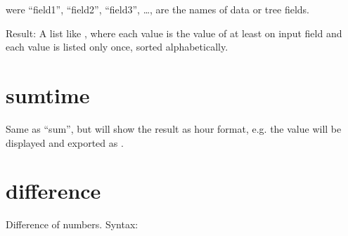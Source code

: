 \documentclass[letterpaper,10pt,english]{sphinxmanual}
\begin{document}
\begin{sphinxVerbatim}[commandchars=\\\{\}]
 
     
     \PYG{p}{[}  \PYG{p}{]}
     \PYG{p}{[} \PYG{p}{]}
     \PYG{p}{[}\PYG{p}{]}
     \PYG{p}{[}\PYG{p}{]}
\end{sphinxVerbatim}

\sphinxAtStartPar
were “field1”, “field2”, “field3”, …, are the names of data or tree fields.

\sphinxAtStartPar
Result: A list like , where each value is the value of at least on input field and each value is listed only once, sorted alphabetically.


\section{sum\sphinxhyphen{}time}
\label{\detokenize{tree-fields:sum-time}}
\sphinxAtStartPar
Same as “sum”, but will show the result as hour format, e.g. the value  will be displayed and exported as .


\section{difference}
\label{\detokenize{tree-fields:difference}}
\sphinxAtStartPar
Difference of numbers.
Syntax:

\begin{sphinxVerbatim}[commandchars=\\\{\}]
 
     
     \PYG{p}{[}  \PYG{p}{]}
     \PYG{p}{[} \PYG{p}{]}
     \PYG{p}{[}\PYG{p}{]}
     \PYG{p}{[}\PYG{p}{]}
\end{sphinxVerbatim}
\end{document}
